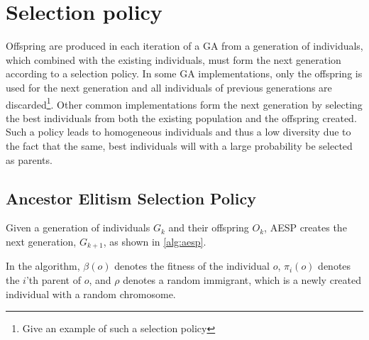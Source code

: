 \section{Selection policy}
Offspring are produced in each iteration of a GA from a generation of individuals, which combined with the existing individuals, must form the next generation according to a selection policy. In some GA implementations, only the offspring is used for the next generation and all individuals of previous generations are discarded\footnote{ Give an example of such a selection policy}. Other common implementations form the next generation by selecting the best individuals from both the existing population and the offspring created\cite{masterThesisGANN}. Such a policy leads to homogeneous individuals and thus a low diversity due to the fact that the same, best individuals will with a large probability be selected as parents.

\subsection{Ancestor Elitism Selection Policy}
Given a generation of individuals $G_k$ and their offspring $O_k$, AESP creates the next generation, $G_{k+1}$, as shown in \cref{alg:aesp}.
%

%
In the algorithm, $\beta(o)$ denotes the fitness of the individual $o$, $\pi_i(o)$ denotes the $i$'th parent of $o$, and $\rho$ denotes a random immigrant, which is a newly created individual with a random chromosome.

